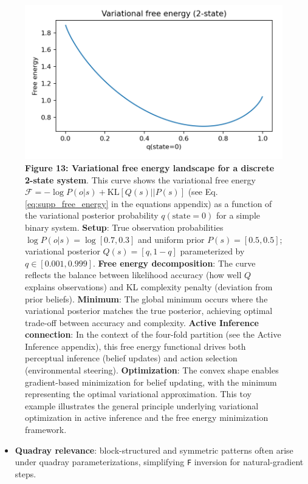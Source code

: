 \documentclass[
  10pt,
]{article}
\newcommand{\passthrough}[1]{#1}
\providecommand{\tightlist}{%
  \setlength{\itemsep}{0pt}\setlength{\parskip}{0pt}}
\begin{document}
\begin{figure}
\centering
\includegraphics{../output/figures/free_energy_curve.png}
\caption{\textbf{Figure 13: Variational free energy landscape for a
discrete 2-state system}. This curve shows the variational free energy
\(\mathcal{F} = -\log P(o|s) + \text{KL}[Q(s)||P(s)]\) (see Eq.
\eqref{eq:supp_free_energy} in the equations appendix) as a function of
the variational posterior probability \(q(\text{state}=0)\) for a simple
binary system. \textbf{Setup}: True observation probabilities
\(\log P(o|s) = \log[0.7, 0.3]\) and uniform prior
\(P(s) = [0.5, 0.5]\); variational posterior \(Q(s) = [q, 1-q]\)
parameterized by \(q \in [0.001, 0.999]\). \textbf{Free energy
decomposition}: The curve reflects the balance between likelihood
accuracy (how well \(Q\) explains observations) and KL complexity
penalty (deviation from prior beliefs). \textbf{Minimum}: The global
minimum occurs where the variational posterior matches the true
posterior, achieving optimal trade-off between accuracy and complexity.
\textbf{Active Inference connection}: In the context of the four-fold
partition (see the Active Inference appendix), this free energy
functional drives both perceptual inference (belief updates) and action
selection (environmental steering). \textbf{Optimization}: The convex
shape enables gradient-based minimization for belief updating, with the
minimum representing the optimal variational approximation. This toy
example illustrates the general principle underlying variational
optimization in active inference and the free energy minimization
framework.}
\end{figure}

\begin{itemize}
\tightlist
\item
  \textbf{Quadray relevance}: block-structured and symmetric patterns
  often arise under quadray parameterizations, simplifying
  \passthrough{\lstinline!F!} inversion for natural-gradient steps.
\end{itemize}
\end{document}
